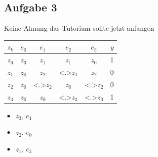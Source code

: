 \documentclass[aspectratio=169,usepdftitle=true,11pt,ngerman,t]{beamer}
\begin{document}
\subsection{Aufgabe 3}
\begin{frame}{Keine Ahnung das Tutorium sollte jetzt anfangen}\onslide<+->
    \begin{exercise}
        \begin{tabular}{c|cccc|c}%
            \(z_k\) & \(e_0\) & \(e_1\) & \(e_2\) & \(e_3\) & \(y\) \\
            \hline%
            \(z_0\) & \(z_3\) & \(z_1\) & \(z_1\) & \alert<+>{\(z_0\)} & 1 \\
            \(z_1\) & \(z_0\) & \(z_2\) & \alert<.>{\(z_1\)} & \(z_2\) & 0 \\
            \(z_2\) & \(z_0\) & \alert<.>{\(z_2\)} & \(z_0\) & \alert<.>{\(z_2\)} & 0 \\
            \(z_3\) & \(z_0\) & \(z_0\) & \alert<.>{\(z_3\)} & \alert<.>{\(z_3\)} & 1 \\
        \end{tabular}
        \onslide<+->

        \begin{itemize}
            \item \(z_3\), \(e_1\)
            \item \(z_2\), \(e_0\)
            \item \(z_1\), \(e_3\)
        \end{itemize}
    \end{exercise}
\end{frame}
\end{document}
